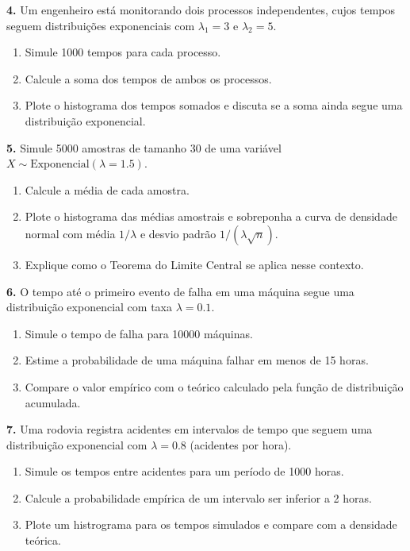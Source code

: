 \documentclass[
]{book}
\begin{document}
\textbf{4.} Um engenheiro está monitorando dois processos independentes, cujos tempos seguem distribuições exponenciais com \(\lambda_1 = 3\) e \(\lambda_2 = 5\).

\begin{enumerate}
\def\labelenumi{(\alph{enumi})}
\item
  Simule 1000 tempos para cada processo.
\item
  Calcule a soma dos tempos de ambos os processos.
\item
  Plote o histograma dos tempos somados e discuta se a soma ainda segue uma distribuição exponencial.
\end{enumerate}

\textbf{5.} Simule 5000 amostras de tamanho 30 de uma variável \(X \sim \text{Exponencial}(\lambda = 1.5)\).

\begin{enumerate}
\def\labelenumi{(\alph{enumi})}
\item
  Calcule a média de cada amostra.
\item
  Plote o histograma das médias amostrais e sobreponha a curva de densidade normal com média \(1/\lambda\) e desvio padrão \(1/(\lambda \sqrt{n})\).
\item
  Explique como o Teorema do Limite Central se aplica nesse contexto.
\end{enumerate}

\textbf{6.} O tempo até o primeiro evento de falha em uma máquina segue uma distribuição exponencial com taxa \(\lambda = 0.1\).

\begin{enumerate}
\def\labelenumi{(\alph{enumi})}
\item
  Simule o tempo de falha para 10000 máquinas.
\item
  Estime a probabilidade de uma máquina falhar em menos de 15 horas.
\item
  Compare o valor empírico com o teórico calculado pela função de distribuição acumulada.
\end{enumerate}

\textbf{7.} Uma rodovia registra acidentes em intervalos de tempo que seguem uma distribuição exponencial com \(\lambda = 0.8\) (acidentes por hora).

\begin{enumerate}
\def\labelenumi{(\alph{enumi})}
\item
  Simule os tempos entre acidentes para um período de 1000 horas.
\item
  Calcule a probabilidade empírica de um intervalo ser inferior a 2 horas.
\item
  Plote um histrograma para os tempos simulados e compare com a densidade teórica.
\end{enumerate}
\end{document}
